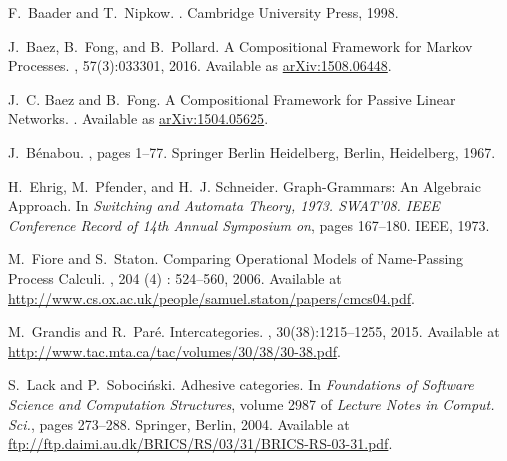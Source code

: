 \documentclass{tac}
\begin{document}
%
%

\begin{references*}	
	F.~Baader and T.~Nipkow.
	.
	\newblock Cambridge University Press, 1998.
	
	J.~Baez, B.~Fong, and B.~Pollard.
	\newblock A {C}ompositional {F}ramework for {M}arkov {P}rocesses.
	, 57(3):033301, 2016.
	\newblock Available as
	\href{https://arxiv.org/abs/1508.06448}{arXiv:1508.06448}.
	
	J.~C. Baez and B.~Fong.
	\newblock A {C}ompositional {F}ramework for {P}assive {L}inear {N}etworks.
	.
	\newblock Available as
	\href{https://arxiv.org/abs/1504.05625}{arXiv:1504.05625}.
	
	J.~B{\'e}nabou.
	, pages 1--77.
	\newblock Springer Berlin Heidelberg, Berlin, Heidelberg, 1967.
	
	H.~Ehrig, M.~Pfender, and H.~J. Schneider.
	\newblock Graph-{G}rammars: An {A}lgebraic {A}pproach.
	\newblock In {\em Switching and Automata Theory, 1973. SWAT'08. IEEE Conference
		Record of 14th Annual Symposium on}, pages 167--180. IEEE, 1973.
	
	M.~Fiore and S.~Staton.
	\newblock Comparing {O}perational {M}odels of {N}ame-{P}assing {P}rocess
	{C}alculi.
	, 204 (4) : 524--560, 2006.
	\newblock Available at
	\href{http://www.cs.ox.ac.uk/people/samuel.staton/papers/cmcs04.pdf}{http://www.cs.ox.ac.uk/people/samuel.staton/papers/cmcs04.pdf}.
	
	M.~Grandis and R.~Par\'{e}.
	\newblock Intercategories.
	, 30(38):1215--1255, 2015.
	\newblock Available at
	\href{http://www.tac.mta.ca/tac/volumes/30/38/30-38.pdf}{http://www.tac.mta.ca/tac/volumes/30/38/30-38.pdf}.
	
	S.~Lack and P.~Soboci{\'n}ski.
	\newblock Adhesive categories.
	\newblock In {\em Foundations of {S}oftware {S}cience and {C}omputation
		{S}tructures}, volume 2987 of {\em Lecture Notes in Comput. Sci.}, pages
	273--288. Springer, Berlin, 2004.
	\newblock Available at
	\href{ftp://ftp.daimi.au.dk/BRICS/RS/03/31/BRICS-RS-03-31.pdf}{ftp://ftp.daimi.au.dk/BRICS/RS/03/31/BRICS-RS-03-31.pdf}.
	

\end{references*}
\end{document}
